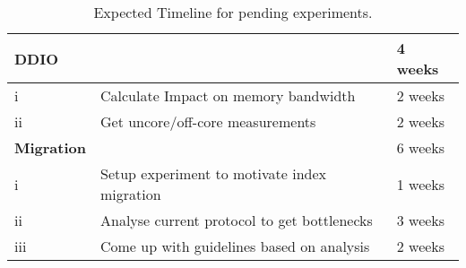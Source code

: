 \begin{table}[t]
\def\arraystretch{1.25}%
\begin{tabular}{lll}
\toprule
\textbf{DDIO} & & 4 weeks \\
\midrule
i & Calculate Impact on memory bandwidth & 2 weeks \\
ii & Get uncore/off-core measurements  & 2 weeks \\
\midrule
\textbf{Migration} & & 6 weeks\\
\midrule
i & Setup experiment to motivate index migration & 1 weeks \\
ii & Analyse current protocol to get bottlenecks & 3 weeks \\
iii & Come up with guidelines based on analysis & 2 weeks \\
\bottomrule
\end{tabular}
\vspace{0.25eX}
\caption{Expected Timeline for pending experiments.}
\label{tbl:timeline}
\end{table}